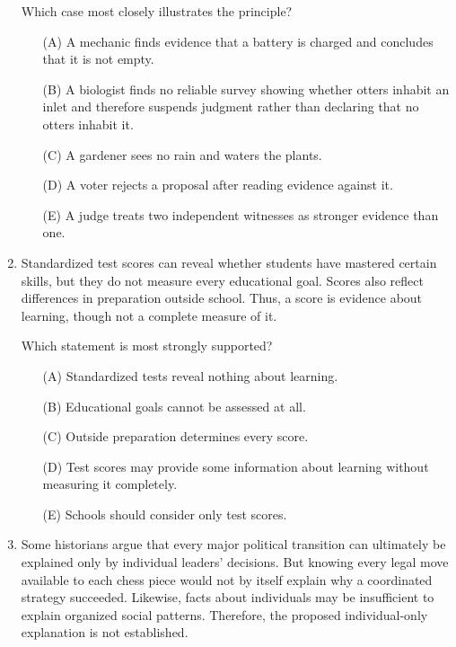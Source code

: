 \begin{enumerate}
Which case most closely illustrates the principle?
\begin{enumerate}
\item[(A)] A mechanic finds evidence that a battery is charged and concludes that it is not empty.
\item[(B)] A biologist finds no reliable survey showing whether otters inhabit an inlet and therefore suspends judgment rather than declaring that no otters inhabit it.
\item[(C)] A gardener sees no rain and waters the plants.
\item[(D)] A voter rejects a proposal after reading evidence against it.
\item[(E)] A judge treats two independent witnesses as stronger evidence than one.
\end{enumerate}

\item Standardized test scores can reveal whether students have mastered certain skills, but they do not measure every educational goal. Scores also reflect differences in preparation outside school. Thus, a score is evidence about learning, though not a complete measure of it.

Which statement is most strongly supported?
\begin{enumerate}
\item[(A)] Standardized tests reveal nothing about learning.
\item[(B)] Educational goals cannot be assessed at all.
\item[(C)] Outside preparation determines every score.
\item[(D)] Test scores may provide some information about learning without measuring it completely.
\item[(E)] Schools should consider only test scores.
\end{enumerate}

\item Some historians argue that every major political transition can ultimately be explained only by individual leaders' decisions. But knowing every legal move available to each chess piece would not by itself explain why a coordinated strategy succeeded. Likewise, facts about individuals may be insufficient to explain organized social patterns. Therefore, the proposed individual-only explanation is not established.


\end{enumerate}
